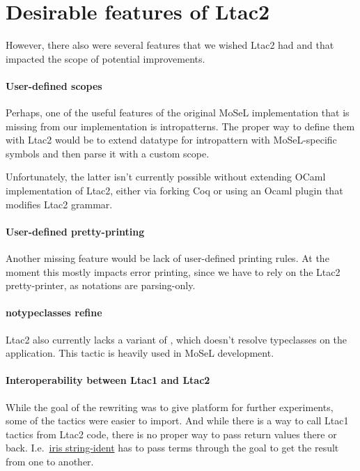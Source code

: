 \section{Desirable features of Ltac2}

However, there also were several features that we wished Ltac2 had and that impacted the scope of potential improvements.

\paragraph{User-defined scopes}

Perhaps, one of the useful features of the original MoSeL implementation that is missing from our implementation is intropatterns.
The proper way to define them with Ltac2 would be to extend datatype for intropattern with MoSeL-specific symbols and then parse it with a custom scope.

Unfortunately, the latter isn't currently possible without extending OCaml implementation of Ltac2, either via forking Coq or using an Ocaml plugin that modifies Ltac2 grammar.

\paragraph{User-defined pretty-printing}
Another missing feature would be lack of user-defined printing rules.
At the moment this mostly impacts error printing, since we have to rely on the Ltac2 pretty-printer, as notations are parsing-only.

\paragraph{notypeclasses refine}

Ltac2 also currently lacks a variant of , which doesn't resolve typeclasses on the application.
This tactic is heavily used in MoSeL development.

\paragraph{Interoperability between Ltac1 and Ltac2}

While the goal of the rewriting was to give platform for further experiments, some of the tactics were easier to import.
And while there is a way to call Ltac1 tactics from Ltac2 code, there is no proper way to pass return values there or back.
I.e.\ \href{https://gitlab.mpi-sws.org/iris/string-ident/}{iris string-ident} has to pass terms through the goal to get the result from one to another.

